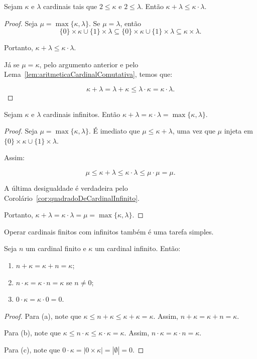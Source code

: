 \begin{lemma}\label{lem:aritmeticaCardinalBasica}
    Sejam $\kappa$ e $\lambda$ cardinais tais que $2\leq \kappa$ e $2\leq \lambda$.
    Então $\kappa + \lambda\leq \kappa \cdot \lambda$.
\end{lemma}
\begin{proof}
    Seja $\mu=\max\{\kappa, \lambda\}$.
    Se $\mu=\lambda$, então
    \[
    \{0\}\times \kappa \cup \{1\}\times \lambda \subseteq \{0\}\times \kappa \cup \{1\}\times \lambda\subseteq \kappa \times \lambda.
    \]

    Portanto, $\kappa+\lambda\leq \kappa\cdot \lambda$.

    Já se $\mu=\kappa$, pelo argumento anterior e pelo Lema~\ref{lem:aritmeticaCardinalComutativa}, temos que:

    \[
    \kappa+\lambda = \lambda + \kappa \leq \lambda \cdot \kappa = \kappa \cdot \lambda.
    \]
\end{proof}

\begin{theorem}
    Sejam $\kappa$ e $\lambda$ cardinais infinitos.
    Então $\kappa + \lambda = \kappa \cdot \lambda = \max\{\kappa, \lambda\}$.
\end{theorem}
\begin{proof}
    Seja $\mu=\max\{\kappa, \lambda\}$.
    É imediato que $\mu\leq \kappa + \lambda$, uma vez que $\mu$ injeta em $\{0\}\times \kappa \cup \{1\}\times \lambda$.

    Assim:

    \[
    \mu \leq \kappa + \lambda \leq \kappa \cdot \lambda \leq \mu \cdot \mu = \mu.
    \]

    A última desigualdade é verdadeira pelo Corolário~\ref{cor:quadradoDeCardinalInfinito}.

    Portanto, $\kappa + \lambda = \kappa \cdot \lambda = \mu=\max\{\kappa, \lambda\}$.
\end{proof}
Operar cardinais finitos com infinitos também é uma tarefa simples.
\begin{lemma}
    Seja $n$ um cardinal finito e $\kappa$ um cardinal infinito.
    Então:
    \begin{enumerate}[label=(\alph*)]
        \item $n+\kappa = \kappa + n = \kappa$;
        \item $n\cdot \kappa = \kappa \cdot n = \kappa$ se $n\neq 0$;
        \item $0\cdot \kappa = \kappa \cdot 0 = 0$.
    \end{enumerate}
\end{lemma}
\begin{proof}
    Para (a), note que $\kappa\leq n+\kappa\leq \kappa+\kappa = \kappa$.
    Assim, $n+\kappa = \kappa + n = \kappa$.

    Para (b), note que $\kappa\leq n\cdot \kappa\leq \kappa\cdot \kappa = \kappa$.
    Assim, $n\cdot \kappa = \kappa \cdot n = \kappa$.

    Para (c), note que $0\cdot \kappa =|0\times \kappa|=|\emptyset|=0$.
\end{proof}

